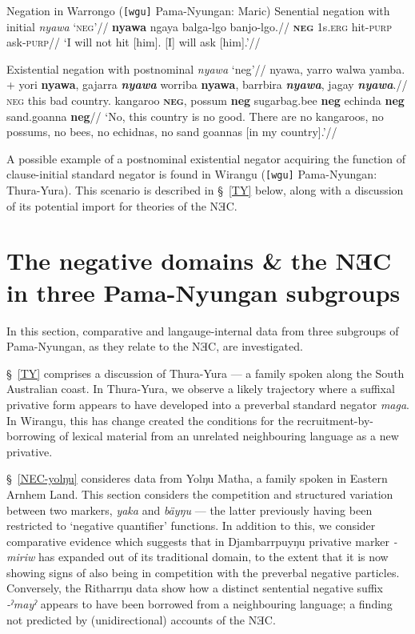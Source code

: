 \pex Negation in Warrongo (\texttt{[wgu]} Pama-Nyungan: Maric)\label{wrg-exx}
\a\begingl\glpreamble Senential negation with initial \textit{nyawa} `\textsc{neg}'//
\gla \textbf{nyawa} ngaya balga-lgo banjo-lgo.//
\glb \textsc{\textbf{neg}} 1\gls{s}\textsc{.erg} hit\textsc{-purp} ask\textsc{-purp}//
\glft`I will not hit [him]. [I] will ask [him].'//\endgl

\a\begingl\glpreamble Existential negation with postnominal \textit{nyawa} `\gls{neg}'//
\gla nyawa, yarro walwa yamba. + yori \textbf{nyawa}, gajarra \textit{\textbf{nyawa}} worriba \textbf{nyawa}, barrbira \textbf{\textit{nyawa}}, jagay \textbf{\textit{nyawa}}.//
\glb \textsc{neg} this bad country. kangaroo \textsc{\textbf{neg}}, possum \textbf{\gls{neg}} sugarbag.bee \textbf{\gls{neg}} echinda \textbf{\gls{neg}} sand.goanna \textbf{\gls{neg}}//
\glft`No, this country is no good. There are no kangaroos, no possums, no bees, no echidnas, no sand goannas [in my country].'//\endgl
\xe

 A possible example of a postnominal existential negator acquiring the function of clause-initial standard negator is found in Wirangu (\texttt{[wgu]} Pama-Nyungan: Thura-Yura). This scenario is described in \S~\ref{TY} below, along with a discussion of its potential import for theories of the NƎC.

\section{The negative domains \& the NƎC in three Pama-Nyungan subgroups}\label{empirical}

In this section, comparative and langauge-internal data from three subgroups of Pama-Nyungan, as they relate to the NƎC, are investigated.

§~\ref{TY} comprises a discussion of Thura-Yura --- a family spoken along the South Australian coast. In Thura-Yura, we observe a likely trajectory where a suffixal privative form appears to have developed into a preverbal standard negator \textit{maga}. In Wirangu, this has change created the conditions for the recruitment-by-borrowing of lexical material from an unrelated neighbouring language as a new privative.

§~\ref{NEC-yolŋu} consideres data from Yolŋu Matha, a family spoken in Eastern Arnhem Land. This section considers the competition and structured variation between two markers, \textit{yaka} and \textit{bäyŋu} --- the latter previously having been restricted to `negative quantifier' functions. In addition to this, we consider comparative evidence which suggests that in Djambarrpuyŋu privative marker \textit{-miriw} has expanded out of its traditional domain, to the extent that it is now showing signs of also being in competition with the preverbal negative particles. Conversely, the Ritharrŋu data show how a distinct sentential negative suffix \textit{-ˀmayˀ} appears to have been borrowed from a neighbouring language; a finding not predicted by (unidirectional) accounts of the NƎC.

